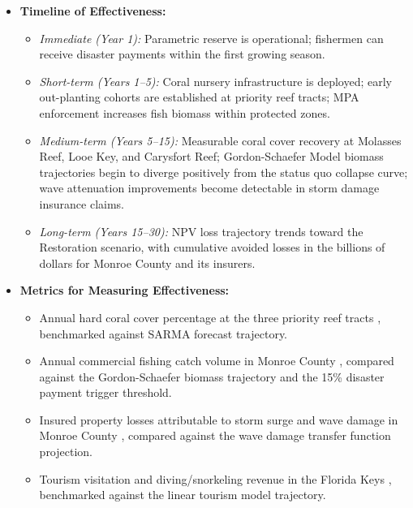 \documentclass[10pt,letterpaper]{article}
\newcounter{metric}
\begin{document}
\begin{itemize}
    \item \textbf{Timeline of Effectiveness:}
    \begin{itemize}
        \item \textit{Immediate (Year 1):} Parametric reserve is operational; fishermen can receive disaster payments within the first growing season.
        \item \textit{Short-term (Years 1--5):} Coral nursery infrastructure is deployed; early out-planting cohorts are established at priority reef tracts; MPA enforcement increases fish biomass within protected zones.
        \item \textit{Medium-term (Years 5--15):} Measurable coral cover recovery at Molasses Reef, Looe Key, and Carysfort Reef; Gordon-Schaefer Model biomass trajectories begin to diverge positively from the status quo collapse curve; wave attenuation improvements become detectable in storm damage insurance claims.
        \item \textit{Long-term (Years 15--30):} NPV loss trajectory trends toward the Restoration scenario, with cumulative avoided losses in the billions of dollars for Monroe County and its insurers.
    \end{itemize}

    \item \textbf{Metrics for Measuring Effectiveness:}
    \begin{itemize}
        \item Annual hard coral cover percentage at the three priority reef tracts \cite{noaa_ncrmp}, benchmarked against SARMA forecast trajectory.
        \item Annual commercial fishing catch volume in Monroe County \cite{fwc_fishing_records}, compared against the Gordon-Schaefer biomass trajectory and the 15\% disaster payment trigger threshold.
        \item Insured property losses attributable to storm surge and wave damage in Monroe County \cite{fema_nfip}, compared against the wave damage transfer function projection.
        \item Tourism visitation and diving/snorkeling revenue in the Florida Keys \cite{monroe_tdc_2023}, benchmarked against the linear tourism model trajectory.
    \end{itemize}

\end{itemize}
\restoregeometry

\newpage

\end{document}
